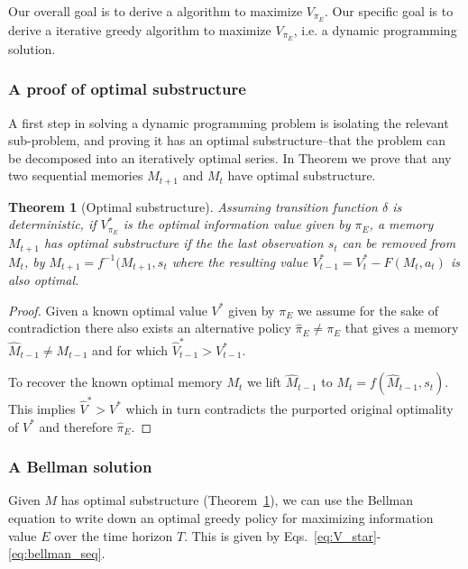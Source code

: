 \documentclass[9pt,twocolumn,twoside]{pnas-new}
\newtheorem{theorem}{Theorem}
\begin{document}
Our overall goal is to derive a algorithm to maximize $V_{\pi_E}$. Our specific goal is to derive a iterative greedy algorithm to maximize $V_{\pi_E}$, i.e. a dynamic programming solution.

\subsubsection*{A proof of optimal substructure}
A first step in solving a dynamic programming problem is isolating the relevant sub-problem, and proving it has an optimal substructure--that the problem can be decomposed into an iteratively optimal series. In Theorem we prove that any two sequential memories $M_{t+1}$ and $M_{t}$ have optimal substructure.

\begin{theorem}[Optimal substructure] \label{theorem:opt_sub}
    Assuming transition function $\delta$ is deterministic, if $V^*_{\pi_E}$ is the optimal information value given by $\pi_E$, a memory $M_{t+1}$ has optimal substructure if the the last observation $s_t$ can be removed from $M_t$, by $M_{t+1} = f^{-1}(M_{t+1}, s_t$ where the resulting value $V^*_{t-1} = V^*_{t} - F(M_t, a_t)$ is also optimal. 
\end{theorem}
\begin{proof}
    Given a known optimal value $V^*$ given by $\pi_E$ we assume for the sake of contradiction there also exists an alternative policy $\hat \pi_E \neq \pi_E$ that gives a memory $\hat M_{t-1} \neq M_{t-1}$ and for which $\hat V^*_{t-1} > V^*_{t-1}$. 

    To recover the known optimal memory $M_t$ we lift $\hat M_{t-1}$ to $M_t = f(\hat M_{t-1}, s_t)$. This implies $\hat V^* > V^*$ which in turn contradicts the purported original optimality of $V^*$ and therefore $\hat \pi_E$.
\end{proof}

\subsubsection*{A Bellman solution}
Given $M$ has optimal substructure (Theorem~\ref{theorem:opt_sub}), we can use the Bellman equation \cite{Bellman} to write down an optimal greedy policy for maximizing information value $E$ over the time horizon $T$. This is given by Eqs.~\ref{eq:V_star}-\ref{eq:bellman_seq}.
\end{document}
